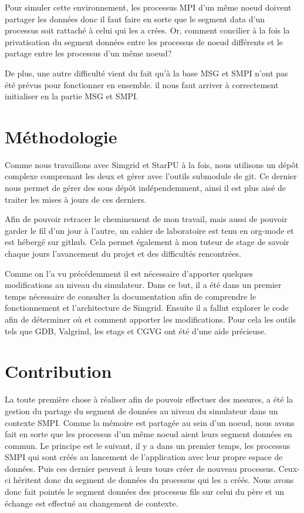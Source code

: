 \documentclass[smallextended]{svjour3}
\begin{document}
Pour simuler cette environnement, les processus MPI d'un même noeud
doivent partager les données donc il faut faire en sorte que le
segment data d'un processus soit rattaché à celui qui les a
crées. Or, comment concilier à la fois la privatisation du segment
données entre les processus de noeud différents et le partage entre
les processus d'un même noeud? 

De plus, une autre difficulté vient du fait qu'à la base MSG et
SMPI n'ont pas été prévus pour fonctionner en ensemble. il nous
faut arriver à correctement initialiser en la partie MSG et SMPI.

\section{Méthodologie}
\label{sec-4}
Comme nous travaillons avec Simgrid et StarPU à la fois, nous
utilisons un dépôt complexe comprenant les deux et gérer avec
l'outils submodule de git. Ce dernier nous permet de gérer des sous
dépôt indépendemment, ainsi il est plus aisé de traiter les mises à
jours de ces derniers.

Afin de pouvoir retracer le cheminement de mon travail, mais aussi
de pouvoir garder le fil d'un jour à l'autre, un cahier de
laboratoire est tenu en org-mode et est hébergé sur github. Cela permet
également à mon tuteur de stage de savoir chaque jours l'avancement
du projet et des difficultés rencontrées.

Comme on l'a vu précédemment il est nécessaire d'apporter quelques
modifications au niveau du simulateur. Dans ce but, il a été dans un
premier temps nécessaire de consulter la documentation afin de
comprendre le fonctionnement et l'architecture de Simgrid. Ensuite
il a fallut explorer le code afin de déterminer où et comment
apporter les modifications. Pour cela les outils tels que GDB,
Valgrind, les etags et CGVG ont été d'une aide précieuse.

\section{Contribution}
\label{sec-5}
La toute première chose à réaliser afin de pouvoir effectuer des
mesures, a été la gestion du partage du segment de données au niveau
du simulateur dans un contexte SMPI. Comme la mémoire est partagée
au sein d'un noeud, nous avons fait en sorte que les processus d'un
même noeud aient leurs segment données en commun. Le principe est le
suivant, il y a dans un premier temps, les processus SMPI qui sont
créés au lancement de l'application avec leur propre espace de
données. Puis ces dernier peuvent à leurs tours créer de nouveau
processus. Ceux-ci héritent donc du segment de données du processus
qui les a créés. Nous avons donc fait pointés le segment données des
processus fils sur celui du père et un échange est effectué au
changement de contexte.
\end{document}
